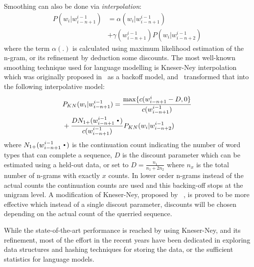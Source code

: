 Smoothing can also be done via \emph{interpolation}:
\begin{align}
P(w_{i}|w_{i-n+1}^{i-1}) &= \alpha(w_{i}|w_{i-n+1}^{i-1})\\\nonumber
&+\gamma(w_{i-n+1}^{i-1})P(w_{i}|w_{i-n+2}^{i-1})
\end{align}
where the term $\alpha(.)$ is calculated using maximum likelihood estimation of the n-gram, or its refinement by deduction some discounts. The most well-known smoothing technique used for language modelling is Kneser-Ney interpolation which was originally proposed in~\cite{kneser1995improved} as a backoff model, and~ transformed that into the following interpolative model:
\begin{align}
&P_{KN}(w_{i}|w_{i-n+1}^{i-1}) = \frac{\max\{c(w_{i-n+1}^{i} - D,0\}}{c(w_{i-n+1}^{i-1})}\\\nonumber
&+ \frac{D N_{1+}(w_{i-n+1}^{i-1}\Bigcdot)}{c(w_{i-n+1}^{i-1})} P_{KN}(w_{i}|w_{i-n+2}^{i-1})
\end{align}
where $N_{1+}(w_{i-n+1}^{i-1}\Bigcdot)$ is the continuation count indicating the number of word types that can complete a sequence, $D$ is the discount parameter which can be estimated using a held-out data, or set to $D=\frac{n_1}{n_{1}+2 n_{2}}$ where $n_x$ is the total number of n-grams with exactly $x$ counts. In lower order n-grams instead of the actual counts the continuation counts are used and this backing-off stops at the unigram level. A modification of Kneser-Ney, proposed by ~\cite{chen1996empirical}, is proved to be more effective which instead of a single discout parameter, discounts will be chosen depending on the actual count of the querried sequence.

While the state-of-the-art performance is reached by using Kneser-Ney,
and its refinement, most of the effort in the recent years have been
dedicated in exploring data structures and hashing techniques for
storing the data, or the sufficient statistics for language models. 

